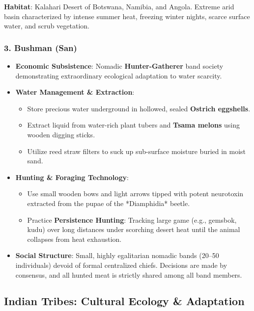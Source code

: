 \documentclass[11pt,a4paper]{article}
\begin{document}
\begin{casebox}
\textbf{Habitat}: Kalahari Desert of Botswana, Namibia, and Angola. Extreme arid basin characterized by intense summer heat, freezing winter nights, scarce surface water, and scrub vegetation.
\end{casebox}

\subsubsection{3. Bushman (San)}
\begin{itemize}[leftmargin=*]
  \item \textbf{Economic Subsistence}: Nomadic \textbf{Hunter-Gatherer} band society demonstrating extraordinary ecological adaptation to water scarcity.
  \item \textbf{Water Management \& Extraction}:
  \begin{itemize}
    \item Store precious water underground in hollowed, sealed \textbf{Ostrich eggshells}.
    \item Extract liquid from water-rich plant tubers and \textbf{Tsama melons} using wooden digging sticks.
    \item Utilize reed straw filters to suck up sub-surface moisture buried in moist sand.
  \end{itemize}
  \item \textbf{Hunting \& Foraging Technology}:
  \begin{itemize}
    \item Use small wooden bows and light arrows tipped with potent neurotoxin extracted from the pupae of the *Diamphidia* beetle.
    \item Practice \textbf{Persistence Hunting}: Tracking large game (e.g., gemsbok, kudu) over long distances under scorching desert heat until the animal collapses from heat exhaustion.
  \end{itemize}
  \item \textbf{Social Structure}: Small, highly egalitarian nomadic bands (20--50 individuals) devoid of formal centralized chiefs. Decisions are made by consensus, and all hunted meat is strictly shared among all band members.
\end{itemize}

\newpage
\subsection{Indian Tribes: Cultural Ecology & Adaptation}
\end{document}
